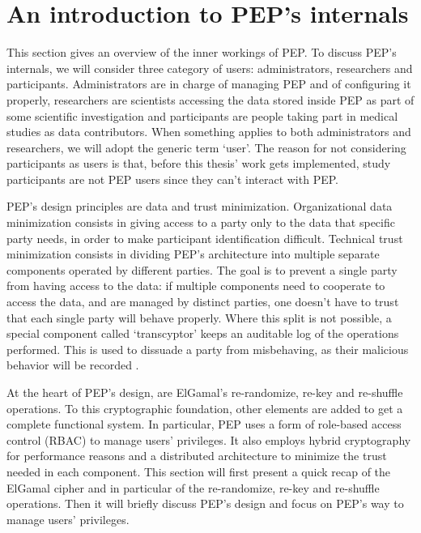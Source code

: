 \documentclass{report}
\begin{document}
\section{An introduction to PEP's internals}
This section gives an overview of the inner workings of PEP. To discuss PEP's internals, we will consider three category of users: administrators, researchers and participants.
Administrators are in charge of managing PEP and of configuring it properly, researchers are scientists accessing the data stored inside PEP as part of some
scientific investigation and participants are people taking part in medical studies as data contributors. When something applies to both administrators and researchers, we will adopt the generic term
\enquote*{user}. The reason for not considering participants as users is that, before this thesis' work gets implemented, study participants are not PEP users since they can't
interact with PEP. \par
PEP's design principles are data and trust minimization. Organizational data minimization consists in giving access to a party only to the data that specific party needs, in order to make
participant identification difficult. Technical trust minimization consists in dividing PEP's architecture into multiple separate components operated by different parties. The goal is to
prevent a single party from having access to the data: if multiple components need to cooperate to access the data, and are managed by distinct parties, one doesn't have to trust that each single party will
behave properly. Where this split is not possible, a special component called \enquote*{transcyptor} keeps an auditable log of the operations performed. This is used to dissuade a party
from misbehaving, as their malicious behavior will be recorded \cite{pep-blueprint}. \par
At the heart of PEP's design, are ElGamal's re-randomize, re-key and re-shuffle operations. To this cryptographic foundation, other elements are added to get a complete functional system. In
particular, PEP uses a form of role-based access control (RBAC) \cite{rbac} to manage users' privileges. It also employs hybrid cryptography for performance reasons and a
distributed architecture to minimize the trust needed in each component. This section will first present a quick recap of the ElGamal cipher and in particular of the re-randomize, re-key and re-shuffle
operations. Then it will briefly discuss PEP's design and focus on PEP's way to manage users' privileges.
\end{document}
